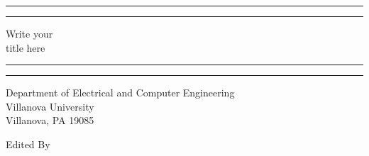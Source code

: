 \begin{titlepage} %

	\centering %
	
	\scshape %
	
	\vspace*{\baselineskip} %
	
	
	\rule{\textwidth}{1.6pt}\vspace*{-\baselineskip}\vspace*{2pt} %
	\rule{\textwidth}{0.4pt} %
	
	\vspace{0.75\baselineskip} %
	
	{\LARGE Write your \\ title here \\} %
	
	\vspace{0.75\baselineskip} %
	
	\rule{\textwidth}{0.4pt}\vspace*{-\baselineskip}\vspace{3.2pt} %
	\rule{\textwidth}{1.6pt} %
	
	\vspace{2\baselineskip} %
	
	
	Department of Electrical and Computer Engineering\\%
	Villanova University\\
	Villanova, PA 19085
	\vspace*{3\baselineskip} %
	
	
	\vspace{.8in}
	Edited By
	
	
	\vspace{0.5\baselineskip} %
	

\end{titlepage}
